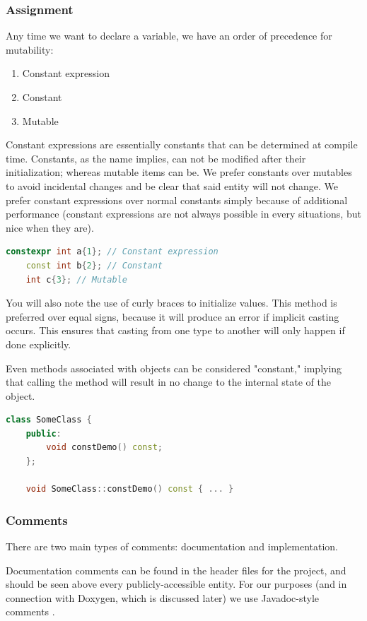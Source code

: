 \subsubsection{Assignment}
Any time we want to declare a variable, we have an order of precedence for mutability: 
\begin{enumerate}
    \item Constant expression
    \item Constant
    \item Mutable
\end{enumerate}
Constant expressions are essentially constants that can be determined at compile time. Constants, as the name implies, can not be modified after their initialization; whereas mutable items can be. We prefer constants over mutables to avoid incidental changes and be clear that said entity will not change. We prefer constant expressions over normal constants simply because of additional performance (constant expressions are not always possible in every situations, but nice when they are). 

\begin{lstlisting}[language=C++]
    constexpr int a{1}; // Constant expression
    const int b{2}; // Constant
    int c{3}; // Mutable
\end{lstlisting}

You will also note the use of curly braces to initialize values. This method is preferred over equal signs, because it will produce an error if implicit casting occurs. This ensures that casting from one type to another will only happen if done explicitly.  

Even methods associated with objects can be considered "constant," implying that calling the method will result in no change to the internal state of the object. 

\begin{lstlisting}[language=C++]
    class SomeClass {
    public:
        void constDemo() const;
    };

    void SomeClass::constDemo() const { ... }
\end{lstlisting}

\subsubsection{Comments}
There are two main types of comments: documentation and implementation. 

Documentation comments can be found in the header files for the project, and should be seen above every publicly-accessible entity. For our purposes (and in connection with Doxygen, which is discussed later) we use Javadoc-style comments \cite{bib:javadoc}. 


